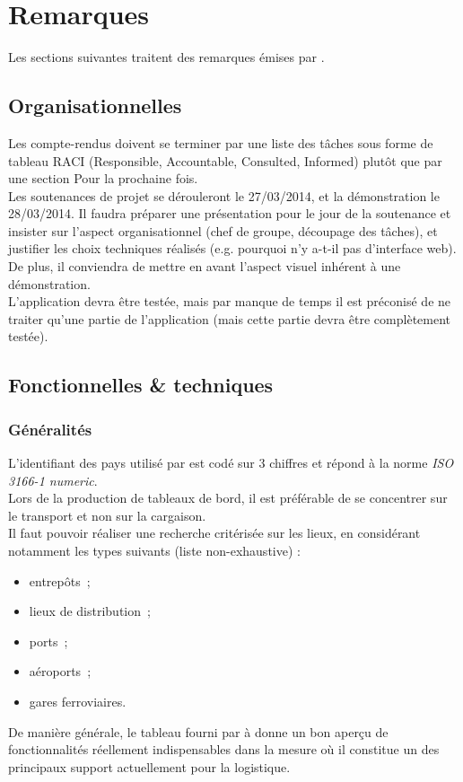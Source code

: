 \documentclass[11pt,fleqn]{report}
\begin{document}
\section{Remarques}

Les sections suivantes traitent des remarques émises par \mo.

\subsection{Organisationnelles}
Les compte-rendus doivent se terminer par une liste des tâches sous forme de tableau RACI (Responsible, Accountable, Consulted, Informed) plutôt que par une section \og{}Pour la prochaine fois\fg{}.\\
Les soutenances de projet se dérouleront le 27/03/2014, et la démonstration le 28/03/2014. Il faudra préparer une présentation pour le jour de la soutenance et insister sur l'aspect organisationnel (chef de groupe, découpage des tâches), et justifier les choix techniques réalisés (e.g. pourquoi n'y a-t-il pas d'interface web).
De plus, il conviendra de mettre en avant l'aspect visuel inhérent à une démonstration.
\\
L'application devra être testée, mais par manque de temps il est préconisé de ne traiter qu'une partie de l'application (mais cette partie devra être complètement testée).

\subsection{Fonctionnelles \& techniques}

\subsubsection{Généralités}
L'identifiant des pays utilisé par \mo est codé sur 3 chiffres et répond à la norme \emph{ISO 3166-1 numeric}.
\\
Lors de la production de tableaux de bord, il est préférable de se concentrer sur le transport et non sur la cargaison.
\\
Il faut pouvoir réaliser une recherche critérisée sur les lieux, en considérant notamment les types suivants (liste non-exhaustive) :
\begin{itemize}
	\item entrepôts~;
	\item lieux de distribution~;
	\item ports~;
	\item aéroports~;
	\item gares ferroviaires.
\end{itemize}
De manière générale, le tableau fourni par \mo à \amo donne un bon aperçu de fonctionnalités réellement indispensables dans la mesure où il constitue un des principaux support actuellement pour la logistique.
\end{document}
